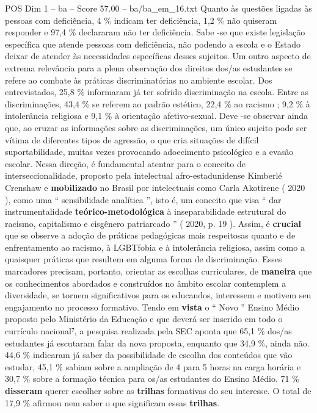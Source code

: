 \begin{textsample}{POS Dim 1 – ba – Score 57.00 – ba/ba\_em\_16.txt}
Quanto às questões ligadas às pessoas com deficiência, 4 \% indicam ter deficiência, 1,2 \% não quiseram responder e 97,4 \% declararam não ter deficiência.
Sabe -se que existe legislação específica que atende pessoas com deficiência, não podendo a escola e o Estado deixar de atender às necessidades específicas desses sujeitos.
Um outro aspecto de extrema relevância para a plena observação dos direitos dos/as estudantes se refere ao combate às práticas discriminatórias no ambiente escolar.
Dos entrevistados, 25,8 \% informaram já ter sofrido discriminação na escola.
Entre as discriminações, 43,4 \% se referem ao padrão estético, 22,4 \% ao racismo ; 9,2 \% à intolerância religiosa e 9,1 \% à orientação afetivo-sexual.
Deve -se observar ainda que, ao cruzar as informações sobre as discriminações, um único sujeito pode ser vítima de diferentes tipos de agressão, o que cria situações de difícil suportabilidade, muitas vezes provocando adoecimento psicológico e a evasão escolar.
Nessa direção, é fundamental atentar para o conceito de interseccionalidade, proposto pela intelectual afro-estadunidense Kimberlé Crenshaw e \textbf{mobilizado} no Brasil por intelectuais como Carla Akotirene ( 2020 ), como uma “ sensibilidade analítica ”, isto é, um conceito que visa “ dar instrumentalidade \textbf{teórico-metodológica} à inseparabilidade estrutural do racismo, capitalismo e cisgênero patriarcado ” ( 2020, p. 19 ).
Assim, é \textbf{crucial} que se observe a adoção de práticas pedagógicas mais respeitosas quanto e de enfrentamento ao racismo, à LGBTfobia e à intolerância religiosa, assim como a quaisquer práticas que resultem em alguma forma de discriminação.
Esses marcadores precisam, portanto, orientar as escolhas curriculares, de \textbf{maneira} que os conhecimentos abordados e construídos no âmbito escolar contemplem a diversidade, se tornem significativos para os educandos, interessem e motivem seu engajamento no processo formativo.
Tendo em \textbf{vista} o “ Novo ” Ensino Médio proposto pelo Ministério da Educação e que deverá ser inserido em todo o currículo nacional⁷, a pesquisa realizada pela SEC aponta que 65,1 \% dos/as estudantes já escutaram falar da nova proposta, enquanto que 34,9 \%, ainda não. 44,6 \% indicaram já saber da possibilidade de escolha dos conteúdos que vão estudar, 45,1 \% sabiam sobre a ampliação de 4 para 5 horas na carga horária e 30,7 \% sobre a formação técnica para os/as estudantes do Ensino Médio. 71 \% \textbf{disseram} querer escolher sobre as \textbf{trilhas} formativas do seu interesse.
O total de 17,9 \% afirmou nem saber o que significam essas \textbf{trilhas}.

\end{textsample}
